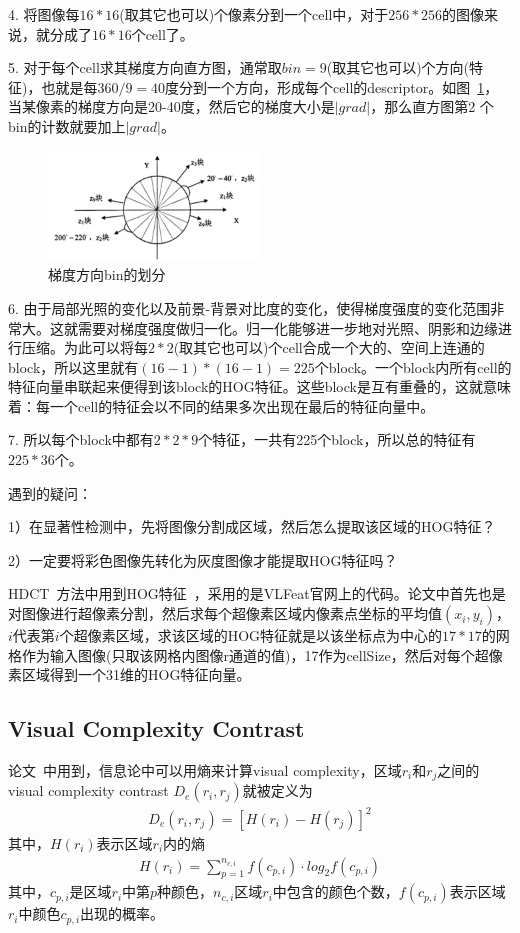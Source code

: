 \documentclass[12pt]{article}
\begin{document}
4. 将图像每$16*16$(取其它也可以)个像素分到一个cell中，对于$256*256$的图像来说，就分成了$16*16$个cell了。

5. 对于每个cell求其梯度方向直方图，通常取$bin = 9$(取其它也可以)个方向(特征)，也就是每$360/9 = 40$度分到一个方向，形成每个cell的descriptor。如图~\ref{fig: 方向梯度}，当某像素的梯度方向是20-40度，然后它的梯度大小是$|grad|$，那么直方图第2
个bin的计数就要加上$|grad|$。

\begin{figure}[!ht]
\centering
\includegraphics[width=0.5\textwidth]{方向梯度.png}
\caption{梯度方向bin的划分}
\label{fig: 方向梯度}
\end{figure} 

6. 由于局部光照的变化以及前景-背景对比度的变化，使得梯度强度的变化范围非常大。这就需要对梯度强度做归一化。归一化能够进一步地对光照、阴影和边缘进行压缩。为此可以将每$2*2$(取其它也可以)个cell合成一个大的、空间上连通的block，所以这里就有$(16-1)*(16-1) = 225$个block。一个block内所有cell的特征向量串联起来便得到该block的HOG特征。这些block是互有重叠的，这就意味着：每一个cell的特征会以不同的结果多次出现在最后的特征向量中。

7. 所以每个block中都有$2*2*9$个特征，一共有225个block，所以总的特征有$225*36$个。

遇到的疑问：

1）在显著性检测中，先将图像分割成区域，然后怎么提取该区域的HOG特征？

2）一定要将彩色图像先转化为灰度图像才能提取HOG特征吗？

HDCT~\cite{kim2014salient}方法中用到HOG特征~\cite{felzenszwalb2010object}，采用的是VLFeat官网上的代码。论文中首先也是对图像进行超像素分割，然后求每个超像素区域内像素点坐标的平均值$(x_i, y_i)$，$i$代表第$i$个超像素区域，求该区域的HOG特征就是以该坐标点为中心的$17*17$的网格作为输入图像(只取该网格内图像r通道的值)，17作为cellSize，然后对每个超像素区域得到一个31维的HOG特征向量。


\subsection{Visual Complexity Contrast}

论文~\cite{zhu2014tag}中用到，信息论中可以用熵来计算visual complexity，区域$r_i$和$r_j$之间的visual complexity contrast $D_e(r_i, r_j)$就被定义为
\begin{align}
D_e(r_i, r_j) = [H(r_i)-H(r_j)]^2
\end{align}
其中，$H(r_i)$表示区域$r_i$内的熵
\begin{align}
H(r_i) = \sum_{p=1}^{n_{c, i}}f(c_{p, i})\cdot log_2f(c_{p, i})
\end{align}
其中，$c_{p, i}$是区域$r_i$中第$p$种颜色，$n_{c, i}$区域$r_i$中包含的颜色个数，$f(c_{p, i})$表示区域$r_i$中颜色$c_{p, i}$出现的概率。
\end{document}
